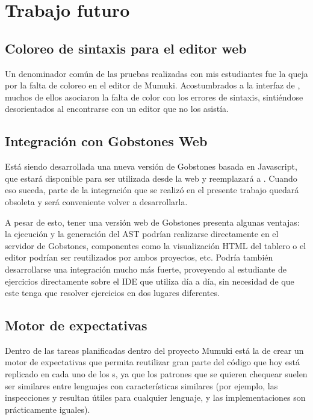 
\section{Trabajo futuro}

\subsection{Coloreo de sintaxis para el editor web}
Un denominador común de las pruebas realizadas con mis estudiantes fue la queja por la falta de coloreo en el editor de Mumuki. Acostumbrados a la interfaz de \pyGob, muchos de ellos asociaron la falta de color con los errores de sintaxis, sintiéndose desorientados al encontrarse con un editor que no los asistía.

\subsection{Integración con Gobstones Web}
Está siendo desarrollada una nueva versión de Gobstones basada en Javascript, que estará disponible para ser utilizada desde la web y reemplazará a \pyGob. Cuando eso suceda, parte de la integración que se realizó en el presente trabajo quedará obsoleta y será conveniente volver a desarrollarla.

A pesar de esto, tener una versión web de Gobstones presenta algunas ventajas: la ejecución y la generación del AST podrían realizarse directamente en el servidor de Gobstones, componentes como la visualización HTML del tablero o el editor podrían ser reutilizados por ambos proyectos, etc. Podría también desarrollarse una integración mucho más fuerte, proveyendo al estudiante de ejercicios directamente sobre el IDE que utiliza día a día, sin necesidad de que este tenga que resolver ejercicios en dos lugares diferentes.

\subsection{Motor de expectativas}
Dentro de las tareas planificadas dentro del proyecto Mumuki está la de crear un motor de expectativas que permita reutilizar gran parte del código que hoy está replicado en cada uno de los \runner s, ya que los patrones que se quieren chequear suelen ser similares entre lenguajes con características similares (por ejemplo, las inspecciones  y  resultan útiles para cualquier lenguaje, y las implementaciones son prácticamente iguales).

